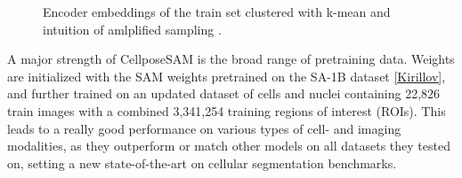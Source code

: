 \begin{figure}[!ht]
    \centering
    \caption{Encoder embeddings of the train set clustered with k-mean and intuition of amlplified sampling \cite{LeCun.1989}.}
    \label{fig:cellposesam}
\end{figure}

A major strength of CellposeSAM is the broad range of pretraining data. Weights are initialized with the SAM weights pretrained on the SA-1B dataset \ref{Kirillov}, and further trained on an updated dataset of cells and nuclei containing 22,826 train images with a combined 3,341,254 training regions of interest (ROIs). This leads to a really good performance on various types of cell- and imaging modalities, as they outperform or match other models on all datasets they tested on, setting a new state-of-the-art on cellular segmentation benchmarks.

